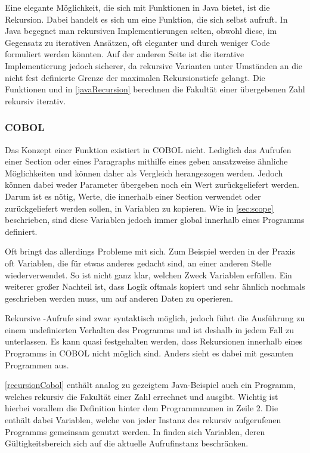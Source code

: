 
Eine elegante Möglichkeit, die sich mit Funktionen in Java bietet, ist die Rekursion. Dabei handelt es sich um eine Funktion, die sich selbst aufruft. In Java begegnet man rekursiven Implementierungen selten, obwohl diese, im Gegensatz zu iterativen Ansätzen, oft eleganter und durch weniger Code formuliert werden könnten. Auf der anderen Seite ist die iterative Implementierung jedoch sicherer, da rekursive Varianten unter Umständen an die nicht fest definierte Grenze der maximalen Rekursionstiefe gelangt. Die Funktionen  und  in \autoref{javaRecursion} berechnen die Fakultät einer übergebenen Zahl rekursiv \bzw iterativ.

\subsubsection*{COBOL}
Das Konzept einer Funktion existiert in COBOL nicht. Lediglich das Aufrufen einer Section oder eines Paragraphs mithilfe eines  geben ansatzweise ähnliche Möglichkeiten und können daher als Vergleich herangezogen werden. Jedoch können dabei weder Parameter übergeben noch ein Wert zurückgeliefert werden. Darum ist es nötig, Werte, die innerhalb einer Section verwendet oder zurückgeliefert werden sollen, in Variablen zu kopieren. Wie in \autoref{sec:scope} beschrieben, sind diese Variablen jedoch immer global innerhalb eines Programms definiert.

Oft bringt das allerdings Probleme mit sich. Zum Beispiel werden in der Praxis oft Variablen, die für etwas anderes gedacht sind, an einer anderen Stelle wiederverwendet. So ist nicht ganz klar, welchen Zweck Variablen erfüllen. Ein weiterer großer Nachteil ist, dass Logik oftmals kopiert und sehr ähnlich nochmals geschrieben werden muss, um auf anderen Daten zu operieren.


Rekursive -Aufrufe sind zwar syntaktisch möglich, jedoch führt die Ausführung zu einem undefinierten Verhalten des Programms und ist deshalb in jedem Fall zu unterlassen. Es kann quasi festgehalten werden, dass Rekursionen innerhalb eines Programms in COBOL nicht möglich sind. Anders sieht es dabei mit gesamten Programmen aus.

\autoref{recursionCobol} enthält analog zu gezeigtem Java-Beispiel auch ein Programm, welches rekursiv die Fakultät einer Zahl errechnet und ausgibt. Wichtig ist hierbei vorallem die  Definition hinter dem Programmnamen in Zeile 2. Die  enthält dabei Variablen, welche von jeder Instanz des rekursiv aufgerufenen Programms gemeinsam genutzt werden. In  finden sich Variablen, deren Gültigkeitsbereich sich auf die aktuelle Aufrufinstanz beschränken.

